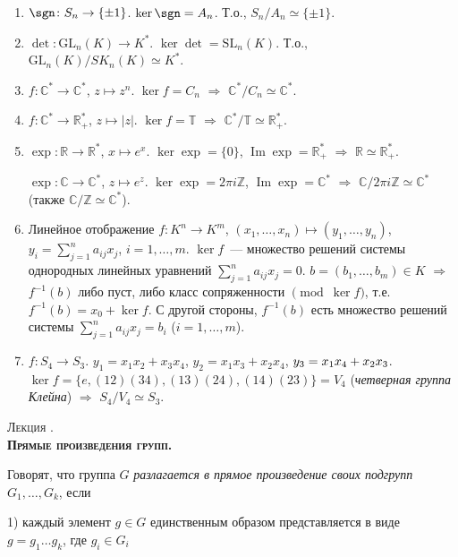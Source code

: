 \documentclass[a4paper]{article}
\newcounter{lec}
\renewcommand{\thelec}{\Roman{lec}}
\newcommand*{\lecture}[1]{\refstepcounter{lec}\vspace{20pt}
\begin{center}{\rmfamily\textsc{Лекция \thelec. \\ \textbf{#1}}}\vspace{5pt}
\end{center}}
\renewcommand{\Im}{\mathop{\mathrm{Im}}\nolimits}
\newcommand*{\p}[1]{#1\nobreak\discretionary{}{\hbox{$\mathsurround=0pt #1$}}{}}
\begin{document}
\begin{ex}
\begin{enumerate}
  \item $\sgn\colon S_n\to \{\pm1\}$. $\ker \sgn=A_n$. Т.о., $S_n/A_n\simeq
  \{\pm1\}$.
  \item $\det\colon \mathrm{GL}_n(K)\to K^*$. $\ker \det = \mathrm{SL}_n(K)$.
  Т.о., $\mathrm{GL}_n(K)/SK_n(K)\simeq K^*$.
  \item $f\colon \mathbb{C}^*\to\mathbb{C}^*$, $z\mapsto z^n$. $\ker
  f=C_n$ $\Rightarrow$ $\mathbb{C}^*/C_n\simeq \mathbb{C}^*$.
  \item $f\colon \mathbb{C}^*\to\mathbb{R}^*_+$, $z\mapsto |z|$. $\ker
  f=\mathbb{T}$ $\Rightarrow$ $\mathbb{C}^*/\mathbb{T}\simeq
  \mathbb{R}^*_+$.
  \item $\exp\colon \mathbb{R}\to\mathbb{R}^*$, $x\mapsto e^x$. $\ker
  \exp=\{0\}$, $\Im \exp=\mathbb{R}^*_+$ $\Rightarrow$ $\mathbb{R}\simeq
  \mathbb{R}^*_+$.

  $\exp\colon \mathbb{C}\to\mathbb{C}^*$, $z\mapsto e^z$. $\ker \exp=2\pi
  i\mathbb{Z}$, $\Im \exp=\mathbb{C}^*$ $\Rightarrow$ $\mathbb{C}/2\pi i\mathbb{Z}\simeq
  \mathbb{C}^*$ (также $\mathbb{C}/\mathbb{Z}\simeq \mathbb{C^*}$).
  \item Линейное отображение $f\colon K^n\to K^m$,
  $(x_1,\ldots,x_n)\mapsto (y_1,\ldots,y_n)$,
  $y_i=\sum\limits_{j=1}^na_{ij}x_j$, $i=1,\ldots,m$. $\ker f$~---
  множество решений системы однородных линейных уравнений
  $\sum\limits_{j=1}^na_{ij}x_j=0$. $b=(b_1,\ldots,b_m)\in K$
  $\Rightarrow$ $f^{-1}(b)$ либо пуст, либо класс сопряженности $\pmod{\ker
  f}$, т.е. $f^{-1}(b)=x_0+\ker f$. С другой стороны, $f^{-1}(b)$
  есть множество решений системы $\sum\limits_{j=1}^na_{ij}x_j=b_i$
  ($i=1,\ldots,m$).
  \item $f\colon S_4\to S_3$. $y_1=x_1x_2+x_3x_4$,
  $y_2=x_1x_3+x_2x_4$, $y_3=x_1x_4\p+x_2x_3$. $\ker f=\{e, (12)(34), (13)(24),
  (14)(23)\}=V_4$ (\emph{четверная группа Клейна}) $\Rightarrow$ $S_4/V_4\simeq
  S_3$.
\end{enumerate}
\end{ex}
\lecture{Прямые произведения групп.}

Говорят, что группа $G$ \emph{разлагается в прямое произведение
своих подгрупп $G_1,\ldots,G_k$}, если

1) каждый элемент $g\in G$ единственным образом представляется в
виде $g=g_1\ldots g_k$, где $g_i\in G_i$
\end{document}
